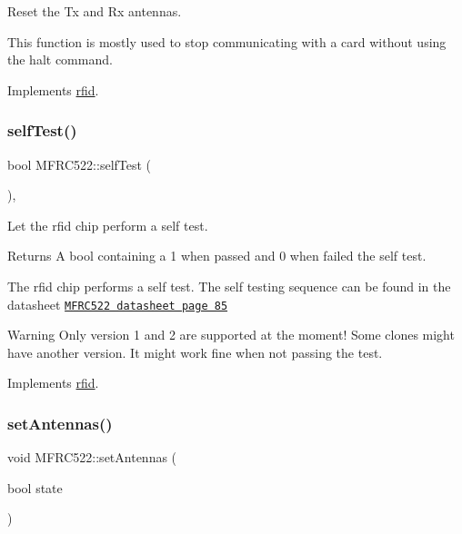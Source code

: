 Reset the Tx and Rx antennas. 

This function is mostly used to stop communicating with a card without using the halt command. 

Implements \mbox{\hyperlink{classrfid_abf4826e77ab7b02f04c8f01d969149c1}{rfid}}.

\mbox{\label{class_m_f_r_c522_adcc4f5eb212c1a94e462eab459bd685e}} 
\subsubsection{\texorpdfstring{self\+Test()}{selfTest()}}
{\footnotesize\ttfamily bool M\+F\+R\+C522\+::self\+Test (\begin{DoxyParamCaption}{ }\end{DoxyParamCaption})\hspace{0.3cm}{\ttfamily [override]}, {\ttfamily [virtual]}}



Let the rfid chip perform a self test. 

\begin{DoxyReturn}{Returns}
A bool containing a 1 when passed and 0 when failed the self test.
\end{DoxyReturn}
The rfid chip performs a self test. The self testing sequence can be found in the datasheet \href{https://www.nxp.com/docs/en/data-sheet/MFRC522.pdf}{\tt M\+F\+R\+C522 datasheet page 85} \begin{DoxyWarning}{Warning}
Only version 1 and 2 are supported at the moment! Some clones might have another version. It might work fine when not passing the test. 
\end{DoxyWarning}


Implements \mbox{\hyperlink{classrfid_a93e5430380a14fd652e7ca1ce6443198}{rfid}}.

\mbox{\label{class_m_f_r_c522_ad33cc8218440b30747fba97aa59c0583}} 
\subsubsection{\texorpdfstring{set\+Antennas()}{setAntennas()}}
{\footnotesize\ttfamily void M\+F\+R\+C522\+::set\+Antennas (\begin{DoxyParamCaption}\item[{bool}]{state }\end{DoxyParamCaption})\hspace{0.3cm}{\ttfamily [protected]}}



